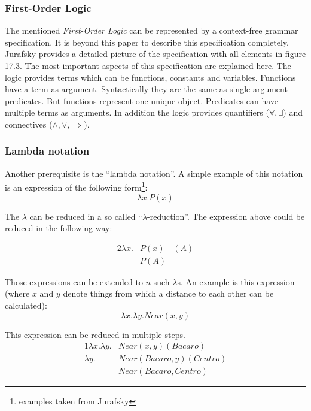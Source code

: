 \documentclass[12pt,twoside]{scrartcl}
\theoremstyle{plain}
\theoremstyle{definition}
\theoremstyle{remark}
\begin{document}
		\subsubsection*{First-Order Logic}
		\label{subSubSec:firstOrderLogic}
		
		The mentioned \textit{First-Order Logic} can be represented by a context-free grammar specification. It is beyond this paper to describe this specification completely. Jurafsky\cite{Jurafsky2009a} provides a detailed picture of the specification with all elements in figure 17.3. The most important aspects of this specification are explained here. The logic provides terms which can be functions, constants and variables. Functions have a term as argument. Syntactically they are the same as single-argument predicates. But functions represent one unique object.
		Predicates can have multiple terms as arguments. In addition the logic provides quantifiers ($\forall, \exists$) and connectives ($\wedge, \vee, \Rightarrow$).
		
		\subsubsection*{Lambda notation}
		\label{subSubSec:lambdaNotation}
		
		Another prerequisite is the ``lambda notation''\cite[p.~593]{Jurafsky2009a}. A simple example of this notation is an expression of the following form\footnote{examples taken from Jurafsky\cite[pp.~593-594]{Jurafsky2009a}}:		
		\[
			\lambda x.P(x)
		\]
		
		The $\lambda$ can be reduced in a so called ``$\lambda$-reduction''\cite[p.~593]{Jurafsky2009a}. The expression above could be reduced in the following way:
		
		\begin{alignat*}{2}
			\lambda x.&P(x)&(A) \\
			&P(A)&
		\end{alignat*}
		
		Those expressions can be extended to $n$ such $\lambda$s. An example is this expression (where $x$ and $y$ denote things from which a distance to each other can be calculated):
		\[
			\lambda x.\lambda y.Near(x,y)
		\]
				
		This expression can be reduced in multiple steps.
		\begin{alignat*}{1}
			\lambda x.\lambda y.&Near(x,y)(Bacaro) \\
			\lambda y.&Near(Bacaro, y)(Centro) \\
			&Near(Bacaro, Centro)
		\end{alignat*}
				
\end{document}
